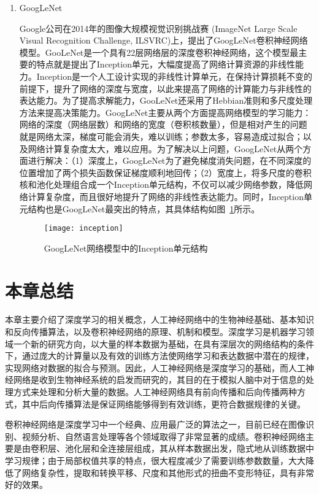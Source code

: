 \begin{enumerate}
\item GoogLeNet\cite{szegedy2015going}

Google公司在2014年的图像大规模视觉识别挑战赛 (ImageNet Large Scale Visual Recognition Challenge, ILSVRC)上，提出了GoogLeNet卷积神经网络模型。GooLeNet是一个具有22层网络层的深度卷积神经网络，这个模型最主要的特点就是提出了Inception单元，大幅度提高了网络计算资源的非线性能力。Inception是一个人工设计实现的非线性计算单元，在保持计算损耗不变的前提下，提升了网络的深度与宽度，以此来提高了网络的计算能力与非线性的表达能力。为了提高求解能力，GooLeNet还采用了Hebbian准则和多尺度处理方法来提高决策能力。GoogLeNet主要从两个方面提高网络模型的学习能力：网络的深度（网络层数）和网络的宽度（卷积核数量），但是相对产生的问题就是网络太深，梯度可能会消失，难以训练；参数太多，容易造成过拟合；以及网络计算复杂度太大，难以应用。为了解决以上问题，GoogLeNet从两个方面进行解决：（1）深度上，GoogLeNet为了避免梯度消失问题，在不同深度的位置增加了两个损失函数保证梯度顺利地回传；（2）宽度上，将多尺度的卷积核和池化处理组合成一个Inception单元结构，不仅可以减少网络参数，降低网络计算复杂度，而且很好地提升了网络的非线性表达能力。同时，Inception单元结构也是GoogLeNet最突出的特点，其具体结构如图~\ref{fig:inception}所示。

\begin{figure}[H] %
  \centering
  \texttt{[image: inception]}
  \caption{GoogLeNet网络模型中的Inception单元结构}
  \label{fig:inception}
\end{figure}

\end{enumerate}



\section{本章总结}
本章主要介绍了深度学习的相关概念，人工神经网络中的生物神经基础、基本知识和反向传播算法，以及卷积神经网络的原理、机制和模型。深度学习是机器学习领域一个新的研究方向，以大量的样本数据为基础，在具有深层次的网络结构的条件下，通过庞大的计算量以及有效的训练方法使网络学习和表达数据中潜在的规律，实现网络对数据的拟合与预测。因此，人工神经网络是深度学习的基础，而人工神经网络是收到生物神经系统的启发而研究的，其目的在于模拟人脑中对于信息的处理方式来处理和分析大量的数据。人工神经网络具有前向传播和后向传播两种方式，其中后向传播算法是保证网络能够得到有效训练，更符合数据规律的关键。

卷积神经网络是深度学习中一个经典、应用最广泛的算法之一，目前已经在图像识别、视频分析、自然语言处理等各个领域取得了非常显著的成绩。卷积神经网络主要是由卷积层、池化层和全连接层组成，其从样本数据出发，隐式地从训练数据中学习规律；由于局部权值共享的特点，很大程度减少了需要训练参数数量，大大降低了网络复杂性，提取和转换平移、尺度和其他形式的扭曲不变形特征，具有非常好的效果。









